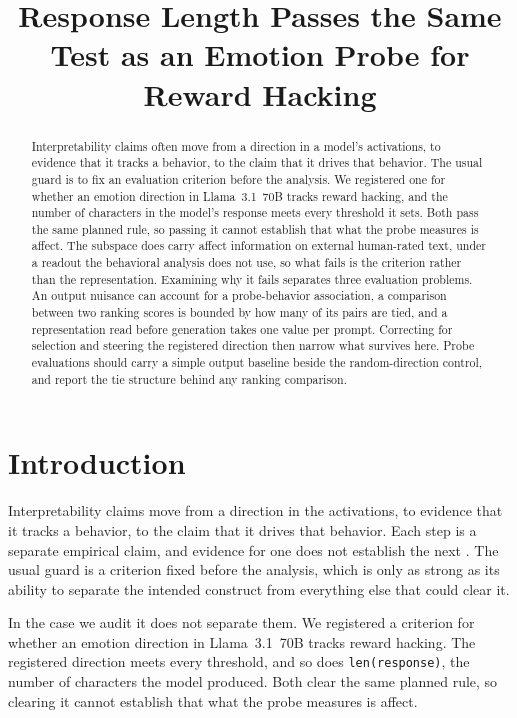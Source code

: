 \documentclass{article}
\title{Response Length Passes the Same Test as an Emotion Probe for Reward Hacking}
\begin{document}
\maketitle

\begin{abstract}
Interpretability claims often move from a direction in a model's activations, to
evidence that it tracks a behavior, to the claim that it drives that behavior. The
usual guard is to fix an evaluation criterion before the analysis. We registered
one for whether an emotion direction in Llama~3.1~70B tracks reward hacking, and
the number of characters in the model's response meets every threshold it sets.
Both pass the same planned rule, so passing it cannot establish that what the probe
measures is affect. The subspace does carry affect information on external
human-rated text, under a readout the behavioral analysis does not use, so what
fails is the criterion rather than the representation. Examining why it fails
separates three evaluation problems. An output nuisance can account for a probe-behavior
association, a comparison between two ranking scores is bounded by how many of its
pairs are tied, and a representation read before generation takes one value per
prompt. Correcting for selection and steering the registered direction then narrow
what survives here. Probe evaluations should carry a simple output baseline beside
the random-direction control, and report the tie structure behind any ranking
comparison.
\end{abstract}

\section{Introduction}
\label{sec:intro}

Interpretability claims move from a direction in the activations, to evidence
that it tracks a behavior, to the claim that it drives that behavior. Each step is
a separate empirical claim, and evidence for one does not establish the next
\citep{joshi2026causality}. The usual guard is a criterion fixed before the analysis, which is only as strong
as its ability to separate the intended construct from everything else that could
clear it.

In the case we audit it does not separate them. We registered a criterion for
whether an emotion direction in Llama~3.1~70B tracks reward hacking. The registered
direction meets every threshold, and so does \texttt{len(response)}, the number of
characters the model produced. Both clear the same planned rule, so clearing it
cannot establish that what the probe measures is affect.
\end{document}
